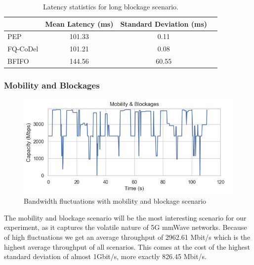 \documentclass[a4paper,english, 12pt]{report}
\begin{document}
\begin{table}[h!]
\centering
\begin{tabular}{l|c|c|c}
\hline
 & \textbf{Mean Latency (ms)} & \textbf{Standard Deviation (ms)} \\
\hline
PEP   & 101.33 & 0.11 \\
FQ-CoDel  &  101.21 & 0.08 \\
BFIFO & 144.56 & 60.55\\
\end{tabular}
\caption{Latency statistics for long blockage scenario.}
\label{tab:throughput_latency_lb}
\end{table}

\subsubsection{Mobility and Blockages}
\label{sec:mobb}

\begin{figure}[h!] %
	\centering
	\includegraphics[scale=0.60]{../diagrams/witestlab/mobb.png}
  	\caption{Bandwidth fluctuations with mobility and blockage scenario}
  	\label{fig:mobb_fluctuations}
\end{figure}

The mobility and blockage scenario will be the most interesting scenario for our experiment, as it captures the volatile nature of 5G mmWave networks. Because of high fluctuations we get an average throughput of 2962.61 Mbit/s which is the highest average throughput of all scenarios. This comes at the cost of the highest standard deviation of almost 1Gbit/s, more exactly 826.45 Mbit/s.\\
\end{document}
